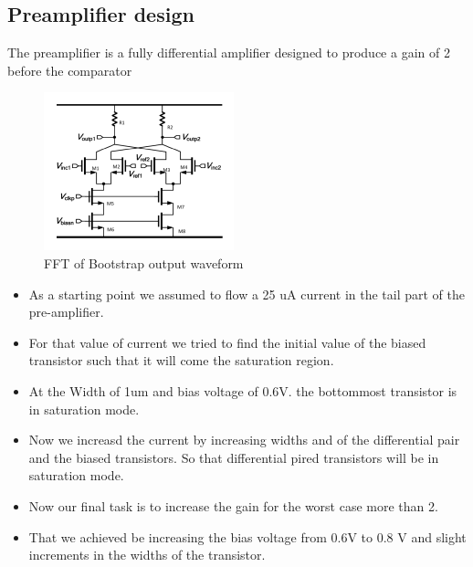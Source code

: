 \documentclass[a4paper,12pt]{article}
\begin{document}
\subsection{Preamplifier design}
The preamplifier is a fully differential amplifier designed to produce a gain of 2 before the comparator
\begin{figure}[H]
    \centering
    \includegraphics[max width = \textwidth]{Images/Preamp_circ.png}
    \caption{FFT of Bootstrap output waveform}
    \label{fig:enter-label}
\end{figure}
\begin{itemize}
    \item As a starting point we assumed to flow  a 25 uA current in the tail part of the pre-amplifier.
    \item For that value of current we tried to find the initial value of the biased transistor such that it will come the saturation region.
    \item At the Width of 1um and bias voltage of 0.6V. the bottommost transistor is in saturation mode.
    \item Now we increasd the current by increasing widths and of the differential pair and the biased transistors. So that differential pired transistors will be in saturation mode.
    \item Now our final task is to increase the gain for the worst case more than 2.
    \item That we achieved be increasing the bias voltage from 0.6V to 0.8 V and slight increments in the widths of the transistor.
\end{itemize}
\end{document}
